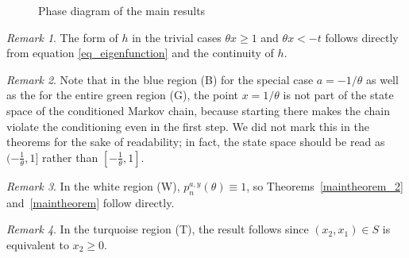 \documentclass[12pt]{article}
\renewcommand{\P}{\mathbb{P}} %
\newcommand{\1}{\mathds{1}}
\renewcommand{\d}{\mathrm{d}}
\theoremstyle{definition}
\theoremstyle{plain}
\theoremstyle{remark}
\newtheorem{Remark}{Remark}
\begin{document}
\begin{figure}[H]
\begin{center}
\begin{tikzpicture}[scale=0.8]
\end{tikzpicture}
\end{center}
\caption{Phase diagram of the main results}
\label{fig:map}
\end{figure}
\begin{Remark}
  The form of $h$ in the trivial cases $\theta x\ge1$ and $\theta x<-t$ follows directly from equation \eqref{eq_eigenfunction} and the continuity of $h$.
\end{Remark}
\begin{Remark}
Note that in the blue region (B) for the special case $a=-1/\theta$ as well as the for the entire green region (G), the point $x=1/\theta$ is not part of the state space of the conditioned Markov chain, because starting there makes the chain violate the conditioning even in the first step. We did not mark this in the theorems for the sake of readability; in fact, the state space should be read as $(-\frac{1}{\theta},1]$ rather than $[-\frac{1}{\theta},1]$.
\end{Remark}
\begin{Remark}
   In the white region (W), $p_n^{a,y}(\theta)\equiv 1$, so Theorems~\ref{maintheorem_2} and~\ref{maintheorem} follow directly.
\end{Remark}
\begin{Remark}
    In the turquoise region (T), the result follows since $(x_2,x_1)\in S$ is equivalent to $x_2\ge0$. %
\end{Remark}
\end{document}
